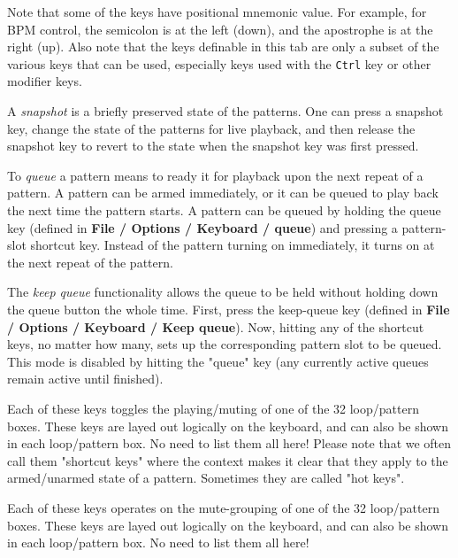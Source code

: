    Note that some of the keys have positional mnemonic value.  For example,
   for BPM control, the semicolon is at the left (down), and the apostrophe
   is at the right (up).
   Also note that the keys definable in this tab are only a subset of the
   various keys that can be used, especially keys used with the
   \texttt{Ctrl} key or other modifier keys.

   A \textsl{snapshot} is a briefly preserved state of the patterns.
   One can press a snapshot key, change the state of the patterns for live
   playback, and then release the snapshot key to revert to the state when
   the snapshot key was first pressed.

   To \textsl{queue}
   a pattern means to ready it for playback upon the next repeat
   of a pattern.  A pattern can be armed immediately, or it can be queued to
   play back the next time the pattern starts.
   A pattern can be queued by holding the queue key (defined in
   \textbf{File / Options / Keyboard / queue}) and pressing a pattern-slot
   shortcut key.  Instead of the pattern turning on immediately, it turns on at
   the next repeat of the pattern.

   The \textsl{keep queue}
   functionality allows the queue to be held without holding
   down the queue button the whole time.  First, press the keep-queue key
   (defined in \textbf{File / Options / Keyboard / Keep queue}).  Now, hitting
   any of the shortcut keys, no matter how many, sets up the corresponding
   pattern slot to be queued.  This mode is disabled by hitting the
   "queue" key (any currently active queues remain active until finished).

   Each of these keys toggles the playing/muting of one of the 32
   loop/pattern boxes.  These keys are layed out logically on the keyboard,
   and can also be shown in each loop/pattern box.  No need to list them all
   here!  Please note that we often call them "shortcut keys" where the context
   makes it clear that they apply to the armed/unarmed state of a pattern.
   Sometimes they are called "hot keys".

   Each of these keys operates on the mute-grouping of one of the 32
   loop/pattern boxes.  These keys are layed out logically on the keyboard,
   and can also be shown in each loop/pattern box.  No need to list them all
   here!

